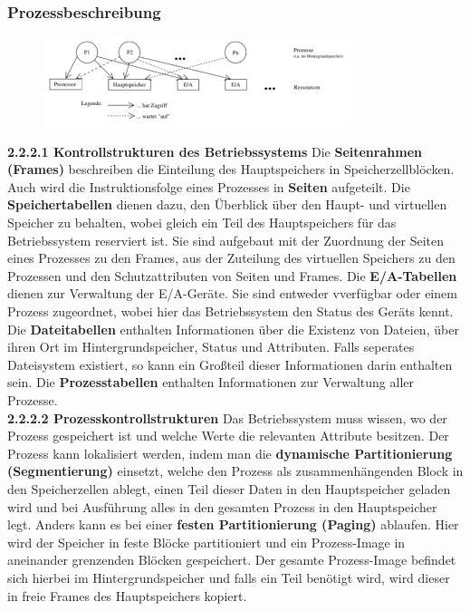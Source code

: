 \documentclass{article}
\begin{document}
\subsubsection{Prozessbeschreibung}
    \begin{figure}[h]
        \centering
	    \includegraphics[width=90mm]{Skizzen/3_Kapitel/Systemressourcen.png}
    \end{figure}
    \textbf{2.2.2.1 Kontrollstrukturen des Betriebssystems}\newline
    Die \textbf{Seitenrahmen (Frames)} beschreiben die Einteilung des Hauptspeichers in Speicherzellblöcken. Auch wird die Instruktionsfolge eines Prozesses in \textbf{Seiten} aufgeteilt.\newline
    Die \textbf{Speichertabellen} dienen dazu, den Überblick über den Haupt- und virtuellen Speicher zu behalten, wobei gleich ein Teil des Hauptspeichers für das Betriebssystem reserviert ist. Sie sind aufgebaut mit der Zuordnung der Seiten eines Prozesses zu den Frames, aus der Zuteilung des virtuellen Speichers zu den Prozessen und den Schutzattributen von Seiten und Frames.\newline
    Die \textbf{E/A-Tabellen} dienen zur Verwaltung der E/A-Geräte. Sie sind entweder vverfügbar oder einem Prozess zugeordnet, wobei hier das Betriebssystem den Status des Geräts kennt.\newline
    Die \textbf{Dateitabellen} enthalten Informationen über die Existenz von Dateien, über ihren Ort im Hintergrundspeicher, Status und Attributen. Falls seperates Dateisystem existiert, so kann ein Großteil dieser Informationen darin enthalten sein.\newline
    Die \textbf{Prozesstabellen} enthalten Informationen zur Verwaltung aller Prozesse.\newline
    \\
    \textbf{2.2.2.2 Prozesskontrollstrukturen}\newline
    Das Betriebssystem muss wissen, wo der Prozess gespeichert ist und welche Werte die relevanten Attribute besitzen.\newline
    Der Prozess kann lokalisiert werden, indem man die \textbf{dynamische Partitionierung (Segmentierung)} einsetzt, welche den Prozess als zusammenhängenden Block in den Speicherzellen ablegt, einen Teil dieser Daten in den Hauptspeicher geladen wird und bei Ausführung alles in den gesamten Prozess in den Hauptspeicher legt. Anders kann es bei einer \textbf{festen Partitionierung (Paging)} ablaufen. Hier wird der Speicher in feste Blöcke partitioniert und ein Prozess-Image in aneinander grenzenden Blöcken gespeichert. Der gesamte Prozess-Image befindet sich hierbei im Hintergrundspeicher und falls ein Teil benötigt wird, wird dieser in freie Frames des Hauptspeichers kopiert.\newline 
\end{document}
